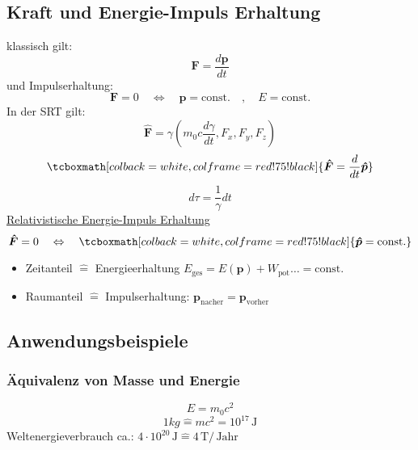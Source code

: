 \documentclass[titlepage,11pt,a4paper,ngerman]{report}
\newcommand{\tx}[1]{\textrm{#1}}
\newcommand{\const}{\tx{const.}}
\renewcommand{\vec}[1]{\boldsymbol{#1}}
\newcommand{\rmbox}[1]{\tcboxmath[colback=white,colframe=red!75!black]{#1}}
\begin{document}

\subsection{Kraft und Energie-Impuls Erhaltung}
klassisch gilt:
\begin{equation*}
\vec{F} = \frac{d\vec{p}}{dt}
\end{equation*}
und Impulserhaltung:
\begin{equation*}
\vec{F} = 0 \quad \Leftrightarrow \quad \vec{p} = \const \quad , \quad E = \const
\end{equation*}
In der SRT gilt:
\begin{equation*}
\vec{\hat F} = \gamma (m_0 c \frac{d\gamma}{dt}, F_x, F_y, F_z)
\end{equation*}
\begin{equation*}
\rmbox{\vec{\hat F} = \frac{d}{dt} \vec{\hat{p}}}
\end{equation*}
\begin{equation*}
d \tau = \frac{1}{\gamma} dt
\end{equation*}
\underline{Relativistische Energie-Impuls Erhaltung}
\begin{equation*}
\vec{\hat{F}} = 0 \quad \Leftrightarrow \quad \rmbox{\vec{\hat{p}} = \const}
\end{equation*}
\begin{itemize}
	\item Zeitanteil $ \widehat{=} $ Energieerhaltung $ E_{\tx{ges}} = E(\vec{p}) + W_{\tx{pot}} \dots = \const $
	\item Raumanteil $ \widehat{=} $ Impulserhaltung: $ \vec{p}_{\tx{nacher}} = \vec{p}_{\tx{vorher}} $
\end{itemize}

\subsection{Anwendungsbeispiele} %
\subsubsection{Äquivalenz von Masse und Energie}
\begin{equation*}
E = m_0 c^2 
\end{equation*}
\begin{equation*}
1 kg \widehat{=} m c^2 = 10^{17} \, \tx{J}
\end{equation*}
Weltenergieverbrauch ca.: $ 4 \cdot 10^{20} \, \tx{J} \widehat{=} 4 \, \tx{T} / \, \tx{Jahr} $
\end{document}
